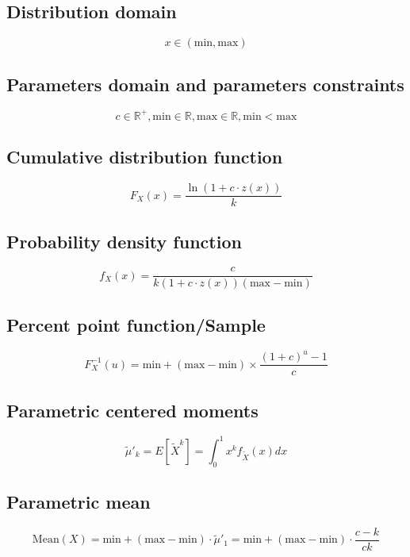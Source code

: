\documentclass{article}
\begin{document}
\subsection{Distribution domain}
\begin{equation*} x\in\left(\text{min},\text{max}\right) \end{equation*}
\subsection{Parameters domain and parameters constraints}
\begin{equation*} c\in\mathbb{R}^{+}, \text{min}\in\mathbb{R}, \text{max}\in\mathbb{R}, \text{min} < \text{max} \end{equation*}
\subsection{Cumulative distribution function}
\begin{equation*} F_{X}\left(x\right)=\frac{\ln\left(1+c\cdot z(x)\right)}{k} \end{equation*}
\subsection{Probability density function}
\begin{equation*} f_{X}\left(x\right)=\frac{c}{k\left(1+c\cdot z(x)\right)\left(\text{max}-\text{min}\right)} \end{equation*}
\subsection{Percent point function/Sample}
\begin{equation*} F^{-1}_{X}\left(u\right)=\text{min}+(\text{max}-\text{min})\times \frac{\left(1+c\right)^{u}-1}{c} \end{equation*}
\subsection{Parametric centered moments}
\begin{equation*} \tilde{\mu}'_{k}=E[\tilde{X}^k]=\int_{0}^{1}x^{k}f_{\tilde{X}}\left(x\right)dx \end{equation*}
\subsection{Parametric mean}
\begin{equation*} \mathrm{Mean}(X)=\text{min}+\left(\text{max}-\text{min}\right)\cdot\tilde{\mu}'_{1}=\text{min}+\left(\text{max}-\text{min}\right)\cdot\frac{c-k}{ck} \end{equation*}
\end{document}
